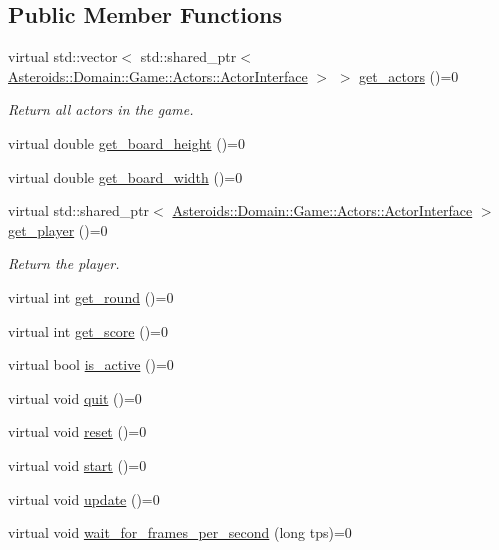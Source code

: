 \subsection*{Public Member Functions}
\begin{DoxyCompactItemize}
\item 
virtual std\+::vector$<$ std\+::shared\+\_\+ptr$<$ \hyperlink{classAsteroids_1_1Domain_1_1Game_1_1Actors_1_1ActorInterface}{Asteroids\+::\+Domain\+::\+Game\+::\+Actors\+::\+Actor\+Interface} $>$ $>$ \hyperlink{classAsteroids_1_1Domain_1_1Game_1_1GameInterface_af5bd347cdac153a538ad7d88e3473693}{get\+\_\+actors} ()=0
\begin{DoxyCompactList}\small\item\em Return all actors in the game. \end{DoxyCompactList}\item 
virtual double \hyperlink{classAsteroids_1_1Domain_1_1Game_1_1GameInterface_a27ad37addb00549ed5123b128edf8edb}{get\+\_\+board\+\_\+height} ()=0
\item 
virtual double \hyperlink{classAsteroids_1_1Domain_1_1Game_1_1GameInterface_ac2bb4da3441fe36f9893d12d8557c93c}{get\+\_\+board\+\_\+width} ()=0
\item 
virtual std\+::shared\+\_\+ptr$<$ \hyperlink{classAsteroids_1_1Domain_1_1Game_1_1Actors_1_1ActorInterface}{Asteroids\+::\+Domain\+::\+Game\+::\+Actors\+::\+Actor\+Interface} $>$ \hyperlink{classAsteroids_1_1Domain_1_1Game_1_1GameInterface_aa542e72a3e9063ab44be7bf44550f8db}{get\+\_\+player} ()=0
\begin{DoxyCompactList}\small\item\em Return the player. \end{DoxyCompactList}\item 
virtual int \hyperlink{classAsteroids_1_1Domain_1_1Game_1_1GameInterface_ac8da5febc9e8115eb166fe9238c32772}{get\+\_\+round} ()=0
\item 
virtual int \hyperlink{classAsteroids_1_1Domain_1_1Game_1_1GameInterface_a8f7ade2512ff188e0647a329acb34848}{get\+\_\+score} ()=0
\item 
virtual bool \hyperlink{classAsteroids_1_1Domain_1_1Game_1_1GameInterface_ad7519687f2a916cef85be8a68c6ce6a4}{is\+\_\+active} ()=0
\item 
virtual void \hyperlink{classAsteroids_1_1Domain_1_1Game_1_1GameInterface_a045096acf97a53c3827be8bd2795ec35}{quit} ()=0
\item 
virtual void \hyperlink{classAsteroids_1_1Domain_1_1Game_1_1GameInterface_ae68b2eaf69d331bd9f90d3297328cc40}{reset} ()=0
\item 
virtual void \hyperlink{classAsteroids_1_1Domain_1_1Game_1_1GameInterface_a9e11cc0884f1865033627d80e3c4078d}{start} ()=0
\item 
virtual void \hyperlink{classAsteroids_1_1Domain_1_1Game_1_1GameInterface_a34d23ca6c1559d84f99a8aeec8ead3ed}{update} ()=0
\item 
virtual void \hyperlink{classAsteroids_1_1Domain_1_1Game_1_1GameInterface_a91c58ac4b19f3e2325b91fff0e3c187a}{wait\+\_\+for\+\_\+frames\+\_\+per\+\_\+second} (long tps)=0
\end{DoxyCompactItemize}


